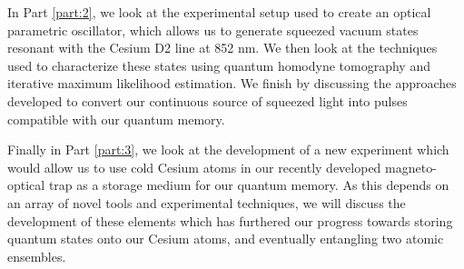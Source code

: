 In Part \ref{part:2}, we look at the experimental setup used to create an optical parametric oscillator, which allows us to generate squeezed vacuum states resonant with the Cesium D2 line at 852 nm.  We then look at the techniques used to characterize these states using quantum homodyne tomography and iterative maximum likelihood estimation.  We finish by discussing the approaches developed to convert our continuous source of squeezed light into pulses compatible with our quantum memory.

Finally in Part \ref{part:3}, we look at the development of a new experiment which would allow us to use cold Cesium atoms in our recently developed magneto-optical trap as a storage medium for our quantum memory.  As this depends on an array of novel tools and experimental techniques, we will discuss the development of these elements which has furthered our progress towards storing quantum states onto our Cesium atoms, and eventually entangling two atomic ensembles.
